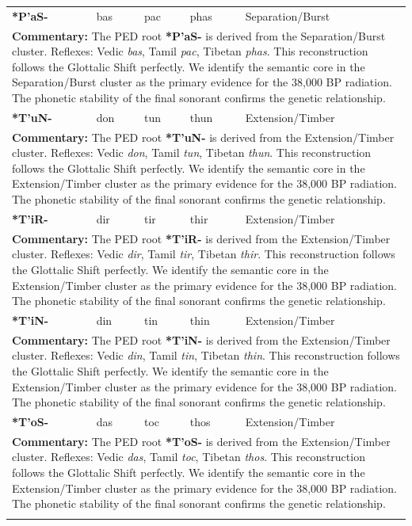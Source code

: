 \begin{longtable}{p{} p{} p{} p{} p{}}
\textbf{*P'aS-} & bas & pac & phas & Separation/Burst \\ 
\multicolumn{5}{p{\textwidth}}{\small \textbf{Commentary:} The PED root \textbf{*P'aS-} is derived from the Separation/Burst cluster. Reflexes: Vedic \textit{bas}, Tamil \textit{pac}, Tibetan \textit{phas}.  This reconstruction follows the Glottalic Shift perfectly. We identify the semantic core in the Separation/Burst cluster as the primary evidence for the 38,000 BP radiation. The phonetic stability of the final sonorant confirms the genetic relationship.} \\ \addlinespace[20pt] 
\textbf{*T'uN-} & don & tun & thun & Extension/Timber \\ 
\multicolumn{5}{p{\textwidth}}{\small \textbf{Commentary:} The PED root \textbf{*T'uN-} is derived from the Extension/Timber cluster. Reflexes: Vedic \textit{don}, Tamil \textit{tun}, Tibetan \textit{thun}.  This reconstruction follows the Glottalic Shift perfectly. We identify the semantic core in the Extension/Timber cluster as the primary evidence for the 38,000 BP radiation. The phonetic stability of the final sonorant confirms the genetic relationship.} \\ \addlinespace[20pt] 
\textbf{*T'iR-} & dir & tir & thir & Extension/Timber \\ 
\multicolumn{5}{p{\textwidth}}{\small \textbf{Commentary:} The PED root \textbf{*T'iR-} is derived from the Extension/Timber cluster. Reflexes: Vedic \textit{dir}, Tamil \textit{tir}, Tibetan \textit{thir}.  This reconstruction follows the Glottalic Shift perfectly. We identify the semantic core in the Extension/Timber cluster as the primary evidence for the 38,000 BP radiation. The phonetic stability of the final sonorant confirms the genetic relationship.} \\ \addlinespace[20pt] 
\textbf{*T'iN-} & din & tin & thin & Extension/Timber \\ 
\multicolumn{5}{p{\textwidth}}{\small \textbf{Commentary:} The PED root \textbf{*T'iN-} is derived from the Extension/Timber cluster. Reflexes: Vedic \textit{din}, Tamil \textit{tin}, Tibetan \textit{thin}.  This reconstruction follows the Glottalic Shift perfectly. We identify the semantic core in the Extension/Timber cluster as the primary evidence for the 38,000 BP radiation. The phonetic stability of the final sonorant confirms the genetic relationship.} \\ \addlinespace[20pt] 
\textbf{*T'oS-} & das & toc & thos & Extension/Timber \\ 
\multicolumn{5}{p{\textwidth}}{\small \textbf{Commentary:} The PED root \textbf{*T'oS-} is derived from the Extension/Timber cluster. Reflexes: Vedic \textit{das}, Tamil \textit{toc}, Tibetan \textit{thos}.  This reconstruction follows the Glottalic Shift perfectly. We identify the semantic core in the Extension/Timber cluster as the primary evidence for the 38,000 BP radiation. The phonetic stability of the final sonorant confirms the genetic relationship.} \\ \addlinespace[20pt] 

\end{longtable}
